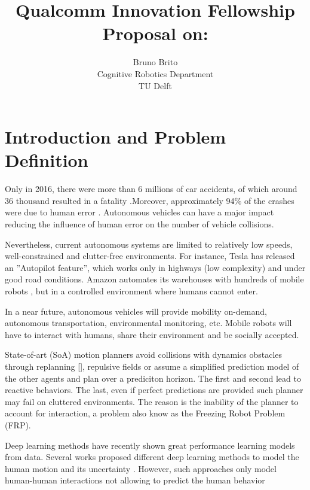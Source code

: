 \documentclass[preprint,12pt]{elsarticle}
\title{\large{Qualcomm Innovation Fellowship
Proposal on:}\\
\Large\tb{Learning to guide a optimal motion planner}
}
\author{
        \small Bruno Brito\\
        \small Cognitive Robotics Department\\
        \small TU Delft\\
        }
\begin{document}
\maketitle

\section{Introduction and Problem Definition}
Only in 2016, there were more than 6 millions of car accidents, of which around 36 thousand resulted in a fatality \cite{HighwayTraffic2017}.Moreover, approximately 94\% of the crashes were due to human error \cite{Singh2015}. Autonomous vehicles can have a major impact reducing the influence of human error on the number of vehicle collisions.

Nevertheless, current autonomous systems are limited to relatively low speeds, well-constrained and clutter-free environments. For instance, Tesla has released an ”Autopilot feature”, which works only in highways (low complexity) and under good road conditions.
Amazon automates its warehouses with hundreds of mobile robots \cite{wurman2008coordinating}, but in a controlled environment where humans cannot enter.

In a near future, autonomous vehicles will provide mobility on-demand, autonomous transportation, environmental monitoring, etc.  Mobile robots will have to interact with humans, share their environment and be socially accepted. 

State-of-art (SoA) motion planners avoid collisions with dynamics obstacles through replanning [], repulsive fields or assume a simplified prediction model of the other agents and plan over a prediciton horizon. The first and second lead to reactive behaviors. The last, even if perfect predictions are provided such planner may  fail on cluttered environments. The reason is the inability of the planner to account for interaction, a problem also know as the Freezing Robot Problem (FRP).

Deep learning methods have recently shown great performance learning models from data. Several works proposed different deep learning methods to model the human motion \cite{Pfeiffer2017} and its uncertainty \cite{social-gan}. However, such approaches only model human-human interactions not allowing to predict the human behavior









\\
 




\end{document}
